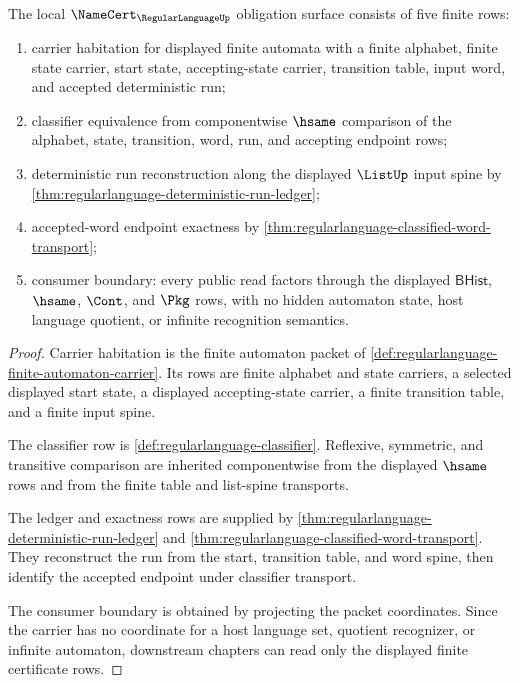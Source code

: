 \begin{theorem}
\label{thm:regularlanguage-namecert-obligation-surface}
The local $\NameCert_{\RegularLanguageUp}$ obligation surface consists of
five finite rows:
\begin{enumerate}
\item carrier habitation for displayed finite automata with a finite alphabet,
finite state carrier, start state, accepting-state carrier, transition table,
input word, and accepted deterministic run;
\item classifier equivalence from componentwise $\hsame$ comparison of the
alphabet, state, transition, word, run, and accepting endpoint rows;
\item deterministic run reconstruction along the displayed $\ListUp$ input
spine by \autoref{thm:regularlanguage-deterministic-run-ledger};
\item accepted-word endpoint exactness by
\autoref{thm:regularlanguage-classified-word-transport};
\item consumer boundary: every public read factors through the displayed
$\mathsf{BHist}$, $\hsame$, $\Cont$, and $\Pkg$ rows, with no hidden automaton
state, host language quotient, or infinite recognition semantics.
\end{enumerate}
\end{theorem}
\begin{proof}
Carrier habitation is the finite automaton packet of
\autoref{def:regularlanguage-finite-automaton-carrier}. Its rows are finite
alphabet and state carriers, a selected displayed start state, a displayed
accepting-state carrier, a finite transition table, and a finite input spine.

The classifier row is \autoref{def:regularlanguage-classifier}. Reflexive,
symmetric, and transitive comparison are inherited componentwise from the
displayed $\hsame$ rows and from the finite table and list-spine transports.

The ledger and exactness rows are supplied by
\autoref{thm:regularlanguage-deterministic-run-ledger} and
\autoref{thm:regularlanguage-classified-word-transport}. They reconstruct the
run from the start, transition table, and word spine, then identify the
accepted endpoint under classifier transport.

The consumer boundary is obtained by projecting the packet coordinates. Since
the carrier has no coordinate for a host language set, quotient recognizer, or
infinite automaton, downstream chapters can read only the displayed finite
certificate rows.
\end{proof}

